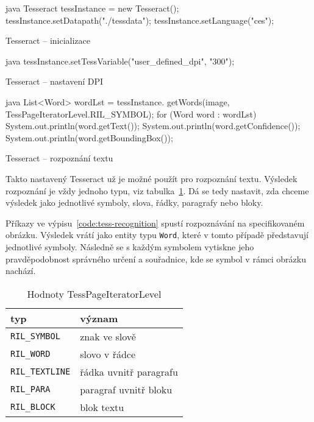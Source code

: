 \documentclass[thesis=B,czech]{FITthesis}[2019/12/23]
\def\myit#1{\texttt{#1}}
\begin{document}
\begin{listing}[p]
	\centering
	\begin{cminted}{java}
Tesseract tessInstance = new Tesseract();
tessInstance.setDatapath("./tessdata");
tessInstance.setLanguage("ces");
	\end{cminted}
	\caption{Tesseract -- inicializace}
	\label{code:tess-init}
\end{listing}

\begin{listing}[p]
	\centering
	\begin{cminted}{java}
tessInstance.setTessVariable("user_defined_dpi", "300");
	\end{cminted}
	\caption{Tesseract -- nastavení DPI}
	\label{code:tess-dpi}
\end{listing}

\begin{listing}[p]
	\centering
	\begin{cminted}{java}
List<Word> wordLst = tessInstance.
        getWords(image, TessPageIteratorLevel.RIL_SYMBOL);
for (Word word : wordLst) {
    System.out.println(word.getText());
    System.out.println(word.getConfidence());
    System.out.println(word.getBoundingBox());
}
	\end{cminted}
	\caption{Tesseract -- rozpoznání textu}
	\label{code:tess-recognition}
\end{listing}

Takto nastavený Tesseract už je možné použít pro rozpoznání textu. Výsledek rozpoznání je vždy jednoho typu, viz tabulka~\ref{tab:tess-iterators}. Dá se tedy nastavit, zda chceme výsledek jako jednotlivé symboly, slova, řádky, paragrafy nebo bloky.

Příkazy ve výpisu~\ref{code:tess-recognition} spustí rozpoznávání na specifikovaném obrázku. Výsledek vrátí jako entity typu \texttt{Word}, které v tomto případě představují jednotlivé symboly. Následně se s každým symbolem vytiskne jeho pravděpodobnost správného určení a souřadnice, kde se symbol v rámci obrázku nachází.

\begin{table}[p]
	\centering
	\begin{tabular}{|l|l|}
		\hline
		\textbf{typ}        & \textbf{význam}        \\ \hline
		\myit{RIL_SYMBOL}   & znak ve slově          \\ \hline
		\myit{RIL_WORD}     & slovo v řádce          \\ \hline
		\myit{RIL_TEXTLINE} & řádka uvnitř paragrafu \\ \hline
		\myit{RIL_PARA}     & paragraf uvnitř bloku  \\ \hline
		\myit{RIL_BLOCK}    & blok textu             \\ \hline
	\end{tabular}
	\caption{Hodnoty TessPageIteratorLevel}
	\label{tab:tess-iterators}
\end{table}
\end{document}
